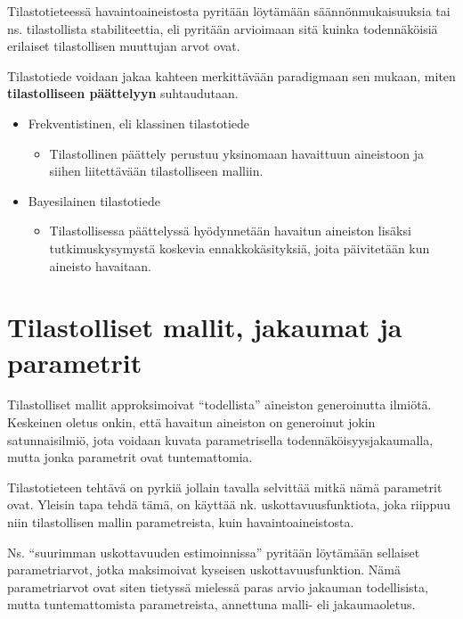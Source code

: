 \documentclass[
]{report}
\providecommand{\tightlist}{%
  \setlength{\itemsep}{0pt}\setlength{\parskip}{0pt}}\usepackage{longtable,booktabs,array}
\begin{document}
Tilastotieteessä havaintoaineistosta pyritään löytämään
säännönmukaisuuksia tai ns. tilastollista stabiliteettia, eli pyritään
arvioimaan sitä kuinka todennäköisiä erilaiset tilastollisen muuttujan
arvot ovat.

Tilastotiede voidaan jakaa kahteen merkittävään paradigmaan sen mukaan,
miten \textbf{tilastolliseen päättelyyn} suhtaudutaan.

\begin{itemize}
\item
  Frekventistinen, eli klassinen tilastotiede

  \begin{itemize}
  \tightlist
  \item
    Tilastollinen päättely perustuu yksinomaan havaittuun aineistoon ja
    siihen liitettävään tilastolliseen malliin.
  \end{itemize}
\item
  Bayesilainen tilastotiede

  \begin{itemize}
  \tightlist
  \item
    Tilastollisessa päättelyssä hyödynnetään havaitun aineiston lisäksi
    tutkimuskysymystä koskevia ennakkokäsityksiä, joita päivitetään kun
    aineisto havaitaan.
  \end{itemize}
\end{itemize}

\hypertarget{tilastolliset-mallit-jakaumat-ja-parametrit}{%
\section{Tilastolliset mallit, jakaumat ja
parametrit}\label{tilastolliset-mallit-jakaumat-ja-parametrit}}

Tilastolliset mallit approksimoivat ``todellista'' aineiston
generoinutta ilmiötä. Keskeinen oletus onkin, että havaitun aineiston on
generoinut jokin satunnaisilmiö, jota voidaan kuvata parametrisella
todennäköisyysjakaumalla, mutta jonka parametrit ovat tuntemattomia.

Tilastotieteen tehtävä on pyrkiä jollain tavalla selvittää mitkä nämä
parametrit ovat. Yleisin tapa tehdä tämä, on käyttää nk.
uskottavuusfunktiota, joka riippuu niin tilastollisen mallin
parametreista, kuin havaintoaineistosta.

Ns. ``suurimman uskottavuuden estimoinnissa'' pyritään löytämään
sellaiset parametriarvot, jotka maksimoivat kyseisen
uskottavuusfunktion. Nämä parametriarvot ovat siten tietyssä mielessä
paras arvio jakauman todellisista, mutta tuntemattomista parametreista,
annettuna malli- eli jakaumaoletus.
\end{document}
